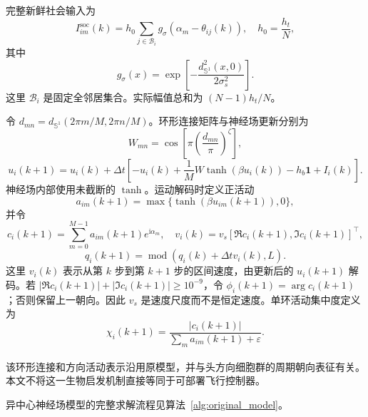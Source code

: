 \documentclass[UTF8,fontset=windows,11pt]{ctexart}
\newcommand{\upcite}[1]{\textsuperscript{\cite{#1}}}
\begin{document}
完整新鲜社会输入为
\begin{equation}
 I^{\mathrm{soc}}_{im}(k)=h_0\sum_{j\in\mathcal B_i}
 g_\sigma\left(\alpha_m-\theta_{ij}(k)\right),
 \quad h_0=\frac{h_t}{N},
\end{equation}
其中
\begin{equation}
 g_\sigma(x)=\exp\left[-\frac{d_{\mathbb S^1}^2(x,0)}{2\sigma_s^2}\right].
\end{equation}
这里 $\mathcal B_i$ 是固定全邻居集合。实际幅值总和为 $(N-1)h_t/N$。

令 $d_{mn}=d_{\mathbb S^1}(2\pi m/M,2\pi n/M)$。环形连接矩阵与神经场更新分别为
\begin{equation}
 W_{mn}=\cos\left[\pi\left(\frac{d_{mn}}{\pi}\right)^\zeta\right],
\end{equation}
\begin{equation}
 u_i(k+1)=u_i(k)+\Delta t\left[-u_i(k)+\frac{1}{M}W\tanh(\beta u_i(k))-h_b\bm 1+I_i(k)\right].
\end{equation}
神经场内部使用未截断的 $\tanh$。运动解码时定义正活动
\begin{equation}
 a_{im}(k+1)=\max\{\tanh(\beta u_{im}(k+1)),0\},
\end{equation}
并令
\begin{equation}
 c_i(k+1)=\sum_{m=0}^{M-1}a_{im}(k+1)e^{\mathrm i\alpha_m},
\quad
 v_i(k)=v_s[\Re c_i(k+1),\Im c_i(k+1)]^\top,
\end{equation}
\begin{equation}
 q_i(k+1)=\operatorname{mod}(q_i(k)+\Delta t v_i(k),L).
\end{equation}
这里 $v_i(k)$ 表示从第 $k$ 步到第 $k+1$ 步的区间速度，由更新后的 $u_i(k+1)$ 解码。若 $|\Re c_i(k+1)|+|\Im c_i(k+1)|\ge10^{-9}$，令 $\phi_i(k+1)=\arg c_i(k+1)$；否则保留上一朝向。因此 $v_s$ 是速度尺度而不是恒定速度。单环活动集中度定义为
\begin{equation}
 \chi_i(k+1)=\frac{|c_i(k+1)|}{\sum_m a_{im}(k+1)+\varepsilon}.
\end{equation}

该环形连接和方向活动表示沿用原模型，并与头方向细胞群的周期朝向表征有关\upcite{Zhang1996}。本文不将这一生物启发机制直接等同于可部署飞行控制器。

异中心神经场模型的完整求解流程见算法~\ref{alg:original_model}。
\end{document}
